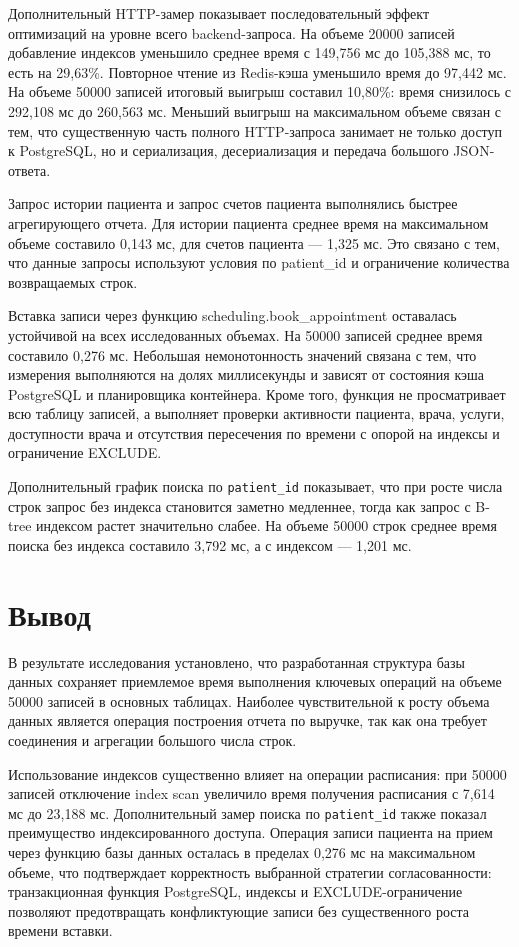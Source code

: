 Дополнительный HTTP-замер показывает последовательный эффект оптимизаций на уровне всего backend-запроса. На объеме 20000 записей добавление индексов уменьшило среднее время с 149,756 мс до 105,388 мс, то есть на 29,63\%. Повторное чтение из Redis-кэша уменьшило время до 97,442 мс. На объеме 50000 записей итоговый выигрыш составил 10,80\%: время снизилось с 292,108 мс до 260,563 мс. Меньший выигрыш на максимальном объеме связан с тем, что существенную часть полного HTTP-запроса занимает не только доступ к PostgreSQL, но и сериализация, десериализация и передача большого JSON-ответа.

Запрос истории пациента и запрос счетов пациента выполнялись быстрее агрегирующего отчета. Для истории пациента среднее время на максимальном объеме составило 0,143 мс, для счетов пациента --- 1,325 мс. Это связано с тем, что данные запросы используют условия по patient\_id и ограничение количества возвращаемых строк.

Вставка записи через функцию scheduling.book\_appointment оставалась устойчивой на всех исследованных объемах. На 50000 записей среднее время составило 0,276 мс. Небольшая немонотонность значений связана с тем, что измерения выполняются на долях миллисекунды и зависят от состояния кэша PostgreSQL и планировщика контейнера. Кроме того, функция не просматривает всю таблицу записей, а выполняет проверки активности пациента, врача, услуги, доступности врача и отсутствия пересечения по времени с опорой на индексы и ограничение EXCLUDE.

Дополнительный график поиска по \texttt{patient\_id} показывает, что при росте числа строк запрос без индекса становится заметно медленнее, тогда как запрос с B-tree индексом растет значительно слабее. На объеме 50000 строк среднее время поиска без индекса составило 3,792 мс, а с индексом --- 1,201 мс.

\section{Вывод}

В результате исследования установлено, что разработанная структура базы данных сохраняет приемлемое время выполнения ключевых операций на объеме 50000 записей в основных таблицах. Наиболее чувствительной к росту объема данных является операция построения отчета по выручке, так как она требует соединения и агрегации большого числа строк.

Использование индексов существенно влияет на операции расписания: при 50000 записей отключение index scan увеличило время получения расписания с 7,614 мс до 23,188 мс. Дополнительный замер поиска по \texttt{patient\_id} также показал преимущество индексированного доступа. Операция записи пациента на прием через функцию базы данных осталась в пределах 0,276 мс на максимальном объеме, что подтверждает корректность выбранной стратегии согласованности: транзакционная функция PostgreSQL, индексы и EXCLUDE-ограничение позволяют предотвращать конфликтующие записи без существенного роста времени вставки.

